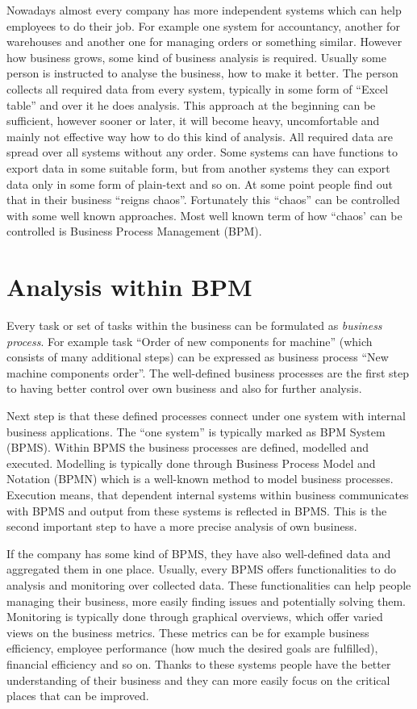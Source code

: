 Nowadays almost every company has more independent systems which can help employees to do their job. For example one system for accountancy, another for warehouses and another one for managing orders or something similar. However how business grows, some kind of business analysis is required. Usually some person is instructed to analyse the business, how to make it better. The person collects all required data from every system, typically in some form of  ``Excel table'' and over it he does analysis. This approach at the beginning can be sufficient, however sooner or later, it will become heavy, uncomfortable and mainly not effective way how to do this kind of analysis. All required data are spread over all systems without any order. Some systems can have functions to export data in some suitable form, but from another systems they can export data only in some form of plain-text and so on.  At some point people find out that in their business ``reigns chaos''. Fortunately this ``chaos'' can be controlled with some well known approaches. Most well known term of how ``chaos' can be controlled is Business Process Management (BPM).

\section{Analysis within BPM}
Every task or set of tasks within the business can be formulated as \textit{business process}. For example task ``Order of new components for machine'' (which consists of many additional steps)  can be expressed as business process ``New machine components order''. The well-defined business processes are the first step to having better control over own business and also for further analysis. 

Next step is that these defined processes connect under one system with internal business applications. The ``one system'' is typically marked as BPM System (BPMS). Within BPMS the business processes are defined, modelled and executed. Modelling is typically done through Business Process Model and Notation (BPMN) which is a well-known method to model business processes. Execution means, that dependent internal systems within business communicates with BPMS and output from these systems is reflected in BPMS. This is the second important step to have a more precise analysis of own business.

If the company has some kind of BPMS, they have also well-defined data and aggregated them in one place. Usually, every BPMS offers functionalities to do analysis and monitoring over collected data. These functionalities can help people managing their business, more easily finding issues and potentially solving them. Monitoring is typically done through graphical overviews, which offer varied views on the business metrics. These metrics can be for example business efficiency, employee performance (how much the desired goals are fulfilled), financial efficiency and so on. Thanks to these systems people have the better understanding of their business and they can more easily focus on the critical places that can be improved.

